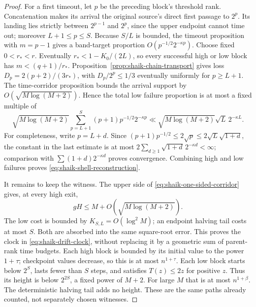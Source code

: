 \documentclass[11pt]{article}
\theoremstyle{remark}\newtheorem{remark}[proposition]{Remark}
\begin{document}
\begin{proof}
For a first timeout, let \(p\) be the preceding block's threshold rank.
Concatenation makes its arrival the original source's direct first
passage to \(2^p\). Its landing lies strictly between \(2^{p-1}\) and
\(2^p\), since the upper endpoint cannot time out; moreover
\(L+1\le p\le S\). Because \(S/L\) is bounded, the timeout proposition
with \(m=p-1\) gives a band-target proportion
\(O(p^{-1/2}2^{-\kappa p})\).
Choose fixed \(0<r_*<r\). Eventually \(r_*<1-K_0/(2L)\), so every
successful high or low block has \(m<(q+1)/r_*\).
Proposition~\ref{prop:shaik-chain-transport} gives loss
\(D_p=2(p+2)/(3r_*)\), with \(D_p/2^p\le1/3\) eventually uniformly
for \(p\ge L+1\). The time-corridor proposition bounds the arrival
support by \(O(\sqrt{M\log(M+2)})\). Hence the total low failure
proportion is at most a fixed multiple of
\[
 \sqrt{M\log(M+2)}
 \sum_{p=L+1}^{S}(p+1)p^{-1/2}2^{-\kappa p}
 \ll \sqrt{M\log(M+2)}\sqrt L\,2^{-\kappa L}.
\]
For completeness, write \(p=L+d\). Since
\((p+1)p^{-1/2}\le2\sqrt p\le2\sqrt L\sqrt{1+d}\),
the constant in the last estimate is at most
\(2\sum_{d\ge1}\sqrt{1+d}\,2^{-\kappa d}<\infty\);
comparison with \(\sum(1+d)2^{-\kappa d}\) proves convergence.
Combining high and low failures proves
\eqref{eq:shaik-shell-reconstruction}.

It remains to keep the witness. The upper side of
\eqref{eq:shaik-one-sided-corridor} gives, at every high exit,
\[
 gH\le M+O(\sqrt{M\log(M+2)}).
\]
The low cost is bounded by \(K_{S,L}=O(\log^2 M)\); an endpoint
halving tail costs at most \(S\). Both are absorbed into the same
square-root error. This proves the clock in
\eqref{eq:shaik-drift-clock}, without replacing it by a geometric
sum of parent-rank time budgets.
Each high block is bounded by its initial value to the power \(1+\tau\);
checkpoint values decrease, so this is at most \(n^{1+\tau}\).
Each low block starts below \(2^S\), lasts fewer than \(S\) steps,
and satisfies \(T(z)\le2z\) for positive \(z\).
Thus its height is below \(2^{2S}\), a fixed power of \(M+2\).
For large \(M\) that is at most \(n^{1+\beta}\).
The deterministic halving tail adds no height. These are the same
paths already counted, not separately chosen witnesses.
\end{proof}
\end{document}
